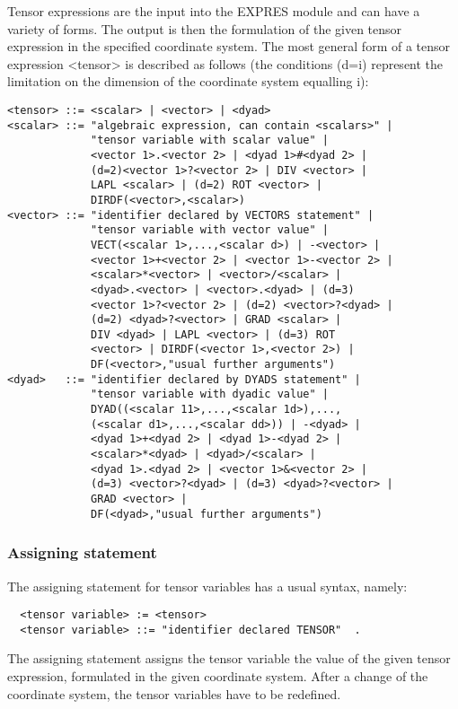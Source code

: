      Tensor expressions  are the  input into  the EXPRES  module and can
have a variety of forms. The output is then the formulation of the given
tensor expression  in the  specified coordinate system. The most general
form of a  tensor  expression  <tensor>  is  described  as  follows (the
conditions  (d=i)  represent  the  limitation  on  the  dimension of the
coordinate system equalling i):
{\small\begin{verbatim}
<tensor> ::= <scalar> | <vector> | <dyad>
<scalar> ::= "algebraic expression, can contain <scalars>" |
             "tensor variable with scalar value" |
             <vector 1>.<vector 2> | <dyad 1>#<dyad 2> |
             (d=2)<vector 1>?<vector 2> | DIV <vector> |
             LAPL <scalar> | (d=2) ROT <vector> |
             DIRDF(<vector>,<scalar>)
<vector> ::= "identifier declared by VECTORS statement" |
             "tensor variable with vector value" |
             VECT(<scalar 1>,...,<scalar d>) | -<vector> |
             <vector 1>+<vector 2> | <vector 1>-<vector 2> |
             <scalar>*<vector> | <vector>/<scalar> |
             <dyad>.<vector> | <vector>.<dyad> | (d=3)
             <vector 1>?<vector 2> | (d=2) <vector>?<dyad> |
             (d=2) <dyad>?<vector> | GRAD <scalar> |
             DIV <dyad> | LAPL <vector> | (d=3) ROT
             <vector> | DIRDF(<vector 1>,<vector 2>) |
             DF(<vector>,"usual further arguments")
<dyad>   ::= "identifier declared by DYADS statement" |
             "tensor variable with dyadic value" |
             DYAD((<scalar 11>,...,<scalar 1d>),...,
             (<scalar d1>,...,<scalar dd>)) | -<dyad> |
             <dyad 1>+<dyad 2> | <dyad 1>-<dyad 2> |
             <scalar>*<dyad> | <dyad>/<scalar> |
             <dyad 1>.<dyad 2> | <vector 1>&<vector 2> |
             (d=3) <vector>?<dyad> | (d=3) <dyad>?<vector> |
             GRAD <vector> |
             DF(<dyad>,"usual further arguments")
\end{verbatim}}

\subsubsection{Assigning statement}


     The assigning statement for  tensor variables  has a  usual syntax,
namely:
\begin{verbatim}
  <tensor variable> := <tensor>
  <tensor variable> ::= "identifier declared TENSOR"  .
\end{verbatim}
The assigning  statement assigns  the tensor  variable the  value of the
given tensor expression,  formulated  in  the  given  coordinate system.
After a change of the coordinate system, the tensor variables have to be
redefined.

